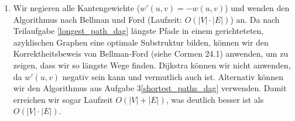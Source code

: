 \documentclass[11pt,a4paper]{article}
\begin{document}
\begin{loesung}
\begin{enumerate}
\begin{proof}
            Wir setzten $P'$ für $P_{i, j}$ ein und erhalten so $\hat{P} = (v_1, v_2, \ldots, v_i, v_1' \ldots, v_m', v_j, \ldots, v_{n - 1}, v_n)$.
            $\hat{P}$ muss zyklenfrei sein, da es sich um einen zusammenhängenden Pfad in einem gerichteten, \emph{azyklischen Graphen} handelt.
            Es kann also kein Knoten doppelt vorkommen.
            Außerdem gilt:
            \begin{align*}
                w(\hat{P}) = w(P_{1,i}) + w(P') + w(P_{j, n}) >
                w(P_{1,i}) + w(P_{i, j}) + w(P_{j, n}) = w(P)
            \end{align*}
            Das Gewicht von $\hat{P}$ ist also größer als das von $P$.
            Das ist ein Widerspruch zur Annahme, dass $P$ ein längster Pfad ist.
        \end{proof}
        \item
        Wir negieren alle Kantengewichte ($w'(u, v) = -w(u, v)$) und wenden den Algorithmus nach Bellman und Ford (Laufzeit: $O(|V| \cdot |E|)$) an.
        Da nach Teilaufgabe \ref*{longest_path_dag} längste Pfade in einem gerichteteten, azyklischen Graphen eine optimale Substruktur bilden, können wir den Korrektheitsbeweis von Bellman-Ford (siehe Cormen 24.1) anwenden, um zu zeigen, dass wir so längste Wege finden.
        Dijkstra können wir nicht anwenden, da $w'(u, v)$ negativ sein kann und vermutlich auch ist.
        Alternativ können wir den Algorithmus aus Aufgabe 3\ref*{shortest_paths_dag} verwenden.
        Damit erreichen wir sogar Laufzeit $O(|V| + |E|)$, was deutlich besser ist als $O(|V| \cdot |E|)$.
    \end{enumerate}
\end{loesung}
\end{document}
